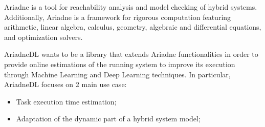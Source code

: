 Ariadne is a tool for reachability analysis and model checking of hybrid systems. Additionally, Ariadne is a framework for rigorous computation featuring arithmetic, linear algebra, calculus, geometry, algebraic and differential equations, and optimization solvers.

AriadneDL wants to be a library that extends Ariadne functionalities in order to provide online estimations of the running system to improve its execution through Machine Learning and Deep Learning techniques. In particular, AriadneDL focuses on 2 main use case: 
\begin{itemize}
	\item Task execution time estimation;
	\item Adaptation of the dynamic part of a hybrid system model;
\end{itemize}

